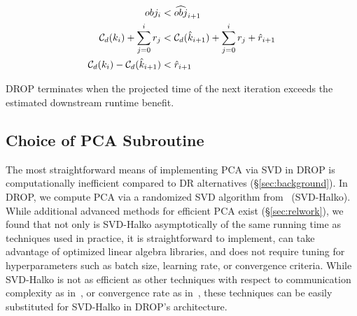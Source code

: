 \vspace{-.4cm}
\begin{align}
  obj_i &< \widehat{obj}_{i+1} \nonumber \\
  \mathcal{C}_{\color{black}d}(k_i) + \sum_{j=0}^i r_j &< \mathcal{C}_{\color{black}d}(\hat{k}_{i+1}) + \sum_{j=0}^{i} r_j + \hat{r}_{i+1} \nonumber \\
  \mathcal{C}_{\color{black}d}(k_i) - \mathcal{C}_{\color{black}d}(\hat{k}_{i+1}) &< \hat{r}_{i+1}  \label{eq:check}
\end{align}

DROP terminates when the projected time of the next iteration exceeds the estimated downstream runtime benefit. 

\subsection{Choice of PCA Subroutine}
\label{subsec:pcaroutine}


The most straightforward means of implementing PCA via SVD in DROP is computationally inefficient compared to DR alternatives (\S\ref{sec:background}).  
In DROP, we compute PCA via a randomized SVD algorithm from~\cite{tropp} (SVD-Halko). 
While additional advanced methods for efficient PCA exist (\S\ref{sec:relwork}), we found that not only is SVD-Halko asymptotically of the same running time as techniques used in practice, it is straightforward to implement, can take advantage of optimized linear algebra libraries, and does not require tuning for hyperparameters such as batch size, learning rate, or convergence criteria.  
While SVD-Halko is not as efficient as other techniques with respect to communication complexity as in~\cite{ppca-sigmod}, or convergence rate as in~\cite{re-new}, these techniques can be easily substituted for SVD-Halko in DROP's architecture.

